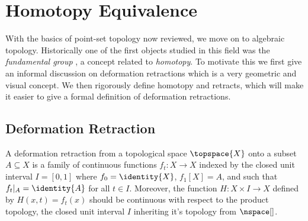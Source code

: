 \section{Homotopy Equivalence}
    With the basics of point-set topology now reviewed, we move on to
    algebraic topology. Historically one of the first objects studied in
    this field was the \textit{fundamental group}%
    , a concept related to \textit{homotopy}.
    To motivate this we first give an informal discussion on deformation
    retractions which is a very geometric and visual concept. We then
    rigorously define homotopy and retracts, which will make it easier
    to give a formal definition of deformation retractions.
    \subsection{Deformation Retraction}
        A deformation retraction from a
        topological space $\topspace{X}$ onto a subset $A\subseteq{X}$
        is a family of continuous functions $f_{t}:X\rightarrow{X}$
        indexed by the closed unit interval $I=[0,1]$ where
        $f_{0}=\identity{X}$, $f_{1}[X]=A$, and such that
        $f_{t}|_{A}=\identity{A}$ for all $t\in{I}$. Moreover, the
        function $H:X\times{I}\rightarrow{X}$ defined by
        $H(x,t)=f_{t}(x)$ should be continuous with respect to the
        product topology, the closed unit interval $I$ inheriting it's
        topology from $\nspace[]$.
